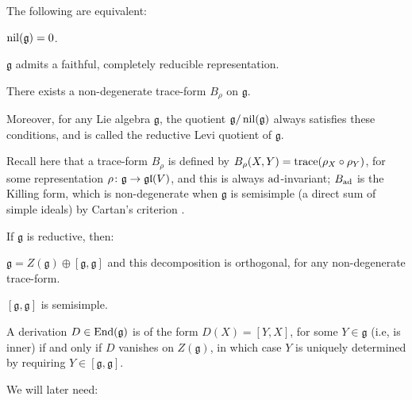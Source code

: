 \documentclass[leqno,12pt]{amsart} %
\begin{document}
\begin{proposition}
  The following are equivalent:
  \begin{conditions}
  \item\label{gra3} $\operatorname{\operatorname{nil}}({\mathfrak g})=0$.
  \item\label{gra1}
    ${\mathfrak g} $ admits a faithful, completely reducible representation.
  \item\label{gra2}
    There exists a non-degenerate trace-form $B_\rho$ on ${\mathfrak g}$.
  \end{conditions}
  Moreover, for any Lie algebra ${\mathfrak g} $, the quotient
  ${\mathfrak g}/\operatorname{\operatorname{nil}}({\mathfrak g})$ always satisfies these conditions, and is called the
  {\df reductive Levi quotient} of ${\mathfrak g} $.

\end{proposition}
\noindent%
Recall here that a {\df trace-form} $B_\rho$ is defined by
$B_\rho(X, Y)=\operatorname{trace}(\rho_X \circ \rho_Y)$, for some representation
$\rho \colon {\mathfrak g} \rightarrow \mathfrak{gl}(V)$, and this is always $\operatorname{ad}$-invariant;
$B_{\operatorname{ad}}$ is the {\df Killing form}, which is non-degenerate when ${\mathfrak g} $ is
semisimple (a direct sum of simple ideals) by Cartan's criterion \cite[Proposition
2.19]{Calderbank_Noppakaew_16}.

\begin{theorem}
  If ${\mathfrak g} $ is reductive, then:
  \begin{conditions}
  \item\label{hra1} ${\mathfrak g} = Z({\mathfrak g})\oplus [{\mathfrak g}, {\mathfrak g}]$
    and this decomposition is orthogonal, for any non-degenerate trace-form.
  \item\label{hra2} $[{\mathfrak g}, {\mathfrak g}]$ is semisimple.
  \item\label{hra3} A derivation $D \in \operatorname{End}({\mathfrak g}) $ is of the form
    $D(X) = [Y, X]$, for some $Y \in {\mathfrak g} $ (i.e, is inner) if and only if $D$
    vanishes on $Z({\mathfrak g})$, in which case $Y$ is uniquely determined by requiring
    $Y \in [{\mathfrak g}, {\mathfrak g}]$.
  \end{conditions}
\end{theorem}

We will later need:
\end{document}
